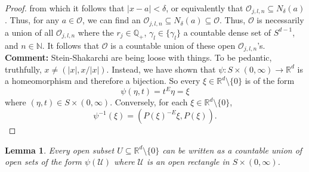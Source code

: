 \documentclass[11pt]{article}
\theoremstyle{theorem}
\newtheorem{lemma}[theorem]{Lemma}
\begin{document}
\begin{proof}
from which it follows that $\vert x - a\vert < \delta$, or equivalently that $\mathcal{O}_{j,l,n} \subseteq N_\delta(a)$. Thus, for any $a\in \mathcal{O}$, we can find an $\mathcal{O}_{j,l,n} \subseteq N_\delta(a) \subseteq \mathcal{O}$. Thus, $\mathcal{O}$ is necessarily a union of all $\mathcal{O}_{j,l,n}$ where the $r_j \in \mathbb{Q}_+$, $\gamma_l \in \{ \gamma_l \}$ a countable dense set of $S^{d-1}$, and $n\in \mathbb{N}$. It follows that $\mathcal{O}$ is a countable union of these open $\mathcal{O}_{j,l,n}$'s. \\

\noindent \textbf{Comment:} Stein-Shakarchi are being loose with things. To be pedantic, truthfully, $x\neq (|x|,x/|x|)$. Instead, we have shown that $\psi:S\times (0,\infty)\to \mathbb{R}^d$ is a homeomorphism and therefore a bijection. So every $\xi\in\mathbb{R}^d \setminus \{0\}$ is of the form
\begin{equation*}
\psi(\eta,t)=t^E\eta=\xi
\end{equation*}
where $(\eta,t)\in S\times (0,\infty)$. Conversely, for each $\xi\in\mathbb{R}^d\setminus\{0\}$,
\begin{equation*}
\psi^{-1}(\xi)=(P(\xi)^{-E}\xi,P(\xi)).
\end{equation*}
\end{proof}




\begin{lemma}\label{lem:OpenRectangle}
Every open subset $U\subseteq \mathbb{R}^d\setminus\{0\}$ can be written as a countable union of open sets of the form $\psi(\mathcal{U})$ where $\mathcal{U}$ is an open rectangle in $S\times (0,\infty)$.
\end{lemma}
\end{document}
